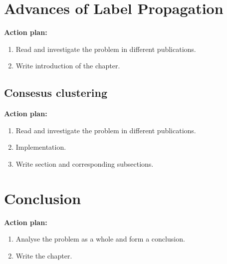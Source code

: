 \documentclass[a4paper, 12pt]{book}
\begin{document}
\chapter{Advances of Label Propagation}
\label{ch1}

\textbf{Action plan:}
   \begin{enumerate}
     \item Read and investigate the problem in different publications.
     \item Write introduction of the chapter.
   \end{enumerate}
   
\section{Consesus clustering}
   \textbf{Action plan:}
   \begin{enumerate}
     \item Read and investigate the problem in different publications.
     \item Implementation.
     \item Write section and corresponding subsections.
   \end{enumerate}
  

\chapter{Conclusion}
\textbf{Action plan:}
   \begin{enumerate}
     \item Analyse the problem as a whole and form a conclusion.
     \item Write the chapter.
   \end{enumerate}


\newpage %
\ \\
\clearpage
{}


\end{document}
